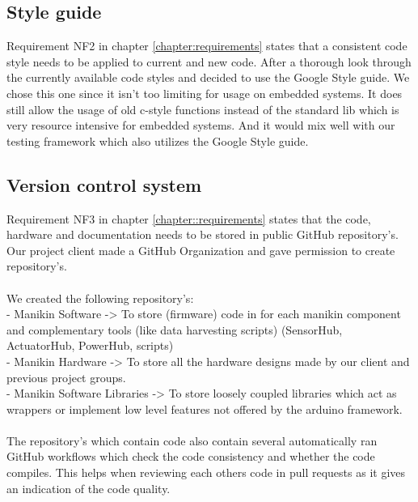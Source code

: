 \subsection{Style guide}
Requirement NF2 in chapter \ref{chapter:requirements} states that a consistent code style needs to be applied to current and new code. After a thorough look through the currently available code styles and decided to use the Google Style guide. We chose this one since it isn't too limiting for usage on embedded systems. It does still allow the usage of old c-style functions instead of the standard lib which is very resource intensive for embedded systems. And it would mix well with our testing framework which also utilizes the Google Style guide.
\subsection{Version control system}
Requirement NF3 in chapter \ref{chapter::requirements} states that the code, hardware and documentation needs to be stored in public GitHub repository's. Our project client made a GitHub Organization and gave permission to create repository's. \\\\
We created the following repository's:\\
- Manikin Software -> To store (firmware) code in for each manikin component and complementary tools (like data harvesting scripts) (SensorHub, ActuatorHub, PowerHub, scripts) \\
- Manikin Hardware -> To store all the hardware designs made by our client and previous project groups. \\
- Manikin Software Libraries -> To store loosely coupled libraries which act as wrappers or implement low level features not offered by the arduino framework. \\\\
The repository's which contain code also contain several automatically ran GitHub workflows which check the code consistency and whether the code compiles. This helps when reviewing each others code in pull requests as it gives an indication of the code quality.


